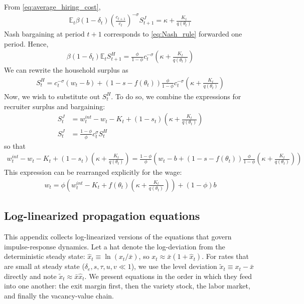 \documentclass[authoryear, review, 12pt]{elsarticle}
\newcommand{\pfrac}[2]{\left(\dfrac{#1}{#2}\right)}
\renewcommand{\pfrac}[2]{\left(\frac{#1}{#2}\right)}
\begin{document}
	From \eqref{eq:average_hiring_cost},
	\begin{align}
		\mathbb{E}_t\beta(1-\delta_t)\pfrac{c_{t+1}}{c_t}^{-\sigma}S_{t+1}^J=\kappa+\frac{K_t}{q(\theta_t)}
	\end{align}
	Nash bargaining at period $t+1$ corresponds to \eqref{eq:Nash_rule} forwarded one period.
	Hence,
	\begin{align}
		\beta (1-\delta_t) \mathbb{E}_tS_{t+1}^H=\frac{\phi}{1-\phi}c_t^{-\sigma}\left(\kappa+\frac{K_{t}}{q(\theta_{t})}\right)
	\end{align}
	We can rewrite the household surplus as
	\begin{align}
		S_t^H=c_t^{-\sigma}(w_t-b)+(1-s-f(\theta_t))\frac{\phi}{1-\phi}c_t^{-\sigma}\left(\kappa+\frac{K_{t}}{q(\theta_{t})}\right)
	\end{align}
	Now, we wish to substitute out $S_t^H$. To do so, we combine the expressions for recruiter surplus and bargaining:
	\begin{align}
		S_t^J&=w_t^{int}-w_t-K_t+(1-s_t)\left(\kappa+\frac{K_t}{q(\theta_t)}\right)\\
		S_t^J&=\frac{1-\phi}{\phi}c_t^{\sigma}S_t^H
	\end{align}
	so that
	\begin{align}
		w_t^{int}-w_t-K_t+(1-s_t)\left(\kappa+\frac{K_t}{q(\theta_t)}\right)=\frac{1-\phi}{\phi}\left(w_t-b+(1-s-f(\theta_t))\frac{\phi}{1-\phi}\left(\kappa+\frac{K_t}{q(\theta_t)}\right)\right)
	\end{align}
	This expression can be rearranged explicitly for the wage:
	\begin{align}
		w_t=\phi\left(w_t^{int}-K_t+f(\theta_t)\left(\kappa+\frac{K_t}{q(\theta_t)}\right)\right)+(1-\phi)b
	\end{align}
\subsection{Log-linearized propagation equations}
\label{app:loglin}

This appendix collects log-linearized versions of the equations that govern
impulse-response dynamics.  Let a hat denote the log-deviation from the
deterministic steady state: $\hat{x}_t \equiv \ln(x_t/\bar{x})$, so
$x_t \approx \bar{x}(1+\hat{x}_t)$.  For rates that are small at steady
state ($\delta_e, s, \tau, u, v \ll 1$), we use the level deviation
$\tilde{x}_t \equiv x_t - \bar{x}$ directly and note $\tilde{x}_t \approx
\bar{x}\hat{x}_t$.   We present equations in the order in which they feed into one
another: the exit margin first, then the variety stock, the labor market, and
finally the vacancy-value chain.
\end{document}
